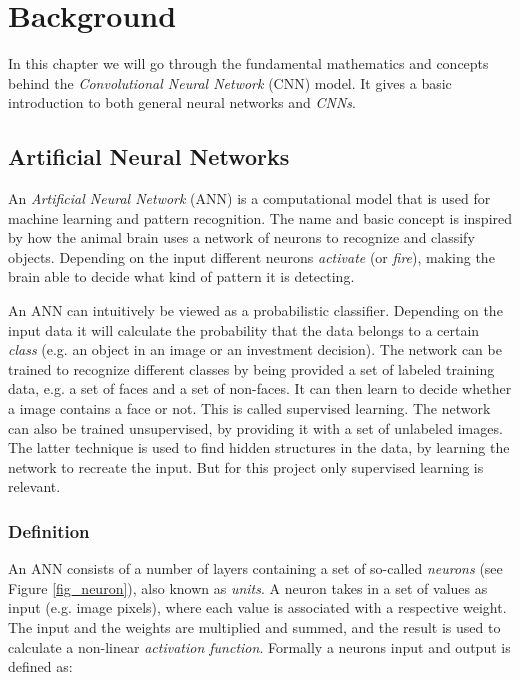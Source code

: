 \chapter{Background}

In this chapter we will go through the fundamental mathematics and concepts behind the \textit{Convolutional Neural Network} (CNN) model. It gives a basic introduction to both general neural networks and \textit{CNNs}.

\section{Artificial Neural Networks}\label{ann}

An \textit{Artificial Neural Network} (ANN) \cite{Minsky1969}\cite{Bishop2006} is a computational model that is used for machine learning and pattern recognition. The name and basic concept is inspired by how the animal brain uses a network of neurons to recognize and classify objects. Depending on the input different neurons \textit{activate} (or \textit{fire}), making the brain able to decide what kind of pattern it is detecting. 

An ANN can intuitively be viewed as a probabilistic classifier. Depending on the input data it will calculate the probability that the data belongs to a certain \textit{class} (e.g. an object in an image or an investment decision). The network can be trained to recognize different classes by being provided a set of labeled training data, e.g. a set of faces and a set of non-faces. It can then learn to decide whether a image contains a face or not. This is called supervised learning. The network can also be trained unsupervised, by providing it with a set of unlabeled images. The latter technique is used to find hidden structures in the data, by learning the network to recreate the input. But for this project only supervised learning is relevant.  

\subsection{Definition} \hfill \break
An ANN  consists of a number of layers containing a set of so-called \textit{neurons} (see Figure \ref{fig_neuron}), also known as \textit{units}. A neuron takes in a set of values as input (e.g. image pixels), where each value is associated with a respective weight. The input and the weights are multiplied and summed, and the result is used to calculate a non-linear \textit{activation function}. Formally a neurons input and output is defined as:


